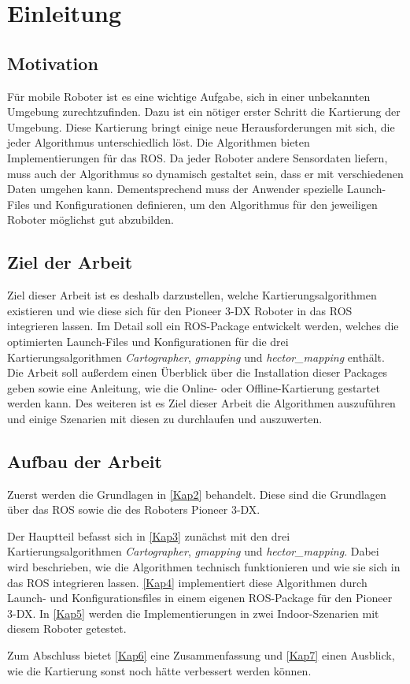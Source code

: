 \chapter{Einleitung}

\section{Motivation}

Für mobile Roboter ist es eine wichtige Aufgabe, sich in einer unbekannten Umgebung zurechtzufinden. Dazu ist ein nötiger erster Schritt die Kartierung der Umgebung. Diese Kartierung bringt einige neue Herausforderungen mit sich, die jeder Algorithmus unterschiedlich löst. Die Algorithmen bieten Implementierungen für das \ac{ROS}. Da jeder Roboter andere Sensordaten liefern, muss auch der Algorithmus so dynamisch gestaltet sein, dass er mit verschiedenen Daten umgehen kann. Dementsprechend muss der Anwender spezielle Launch-Files und Konfigurationen definieren, um den Algorithmus für den jeweiligen Roboter möglichst gut abzubilden.

\section{Ziel der Arbeit}

Ziel dieser Arbeit ist es deshalb darzustellen, welche Kartierungsalgorithmen existieren und wie diese sich für den Pioneer 3-DX Roboter in das \ac{ROS} integrieren lassen. Im Detail soll ein \ac{ROS}-Package entwickelt werden, welches die optimierten Launch-Files und Konfigurationen für die drei Kartierungsalgorithmen \textit{Cartographer}, \textit{gmapping} und \textit{hector\_mapping} enthält. Die Arbeit soll außerdem einen Überblick über die Installation dieser Packages geben sowie eine Anleitung, wie die Online- oder Offline-Kartierung gestartet werden kann. Des weiteren ist es Ziel dieser Arbeit die Algorithmen auszuführen und einige Szenarien mit diesen zu durchlaufen und auszuwerten.

\section{Aufbau der Arbeit}

Zuerst werden die Grundlagen in \autoref{Kap2} behandelt. Diese sind die Grundlagen über das \ac{ROS} sowie die des Roboters Pioneer 3-DX.

Der Hauptteil befasst sich in \autoref{Kap3} zunächst mit den drei Kartierungsalgorithmen \textit{Cartographer}, \textit{gmapping} und \textit{hector\_mapping}. Dabei wird beschrieben, wie die Algorithmen technisch funktionieren und wie sie sich in das \ac{ROS} integrieren lassen. \autoref{Kap4} implementiert diese Algorithmen durch Launch- und Konfigurationsfiles in einem eigenen \ac{ROS}-Package für den Pioneer 3-DX. In \autoref{Kap5} werden die Implementierungen in zwei Indoor-Szenarien mit diesem Roboter getestet.

Zum Abschluss bietet \autoref{Kap6} eine Zusammenfassung und \autoref{Kap7} einen Ausblick, wie die Kartierung sonst noch hätte verbessert werden können.
